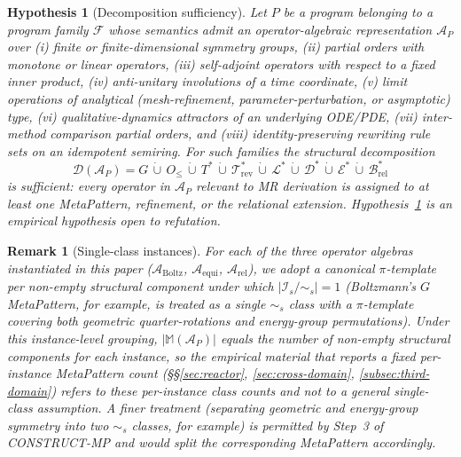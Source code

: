 \documentclass[acmsmall,screen,review]{acmart}
\newtheorem{hypothesis}{Hypothesis}
\newtheorem{remark}{Remark}
\begin{document}
\begin{hypothesis}[Decomposition sufficiency]
\label{hyp:seven-blocks}
Let $P$ be a program belonging to a program family $\mathcal{F}$ whose semantics admit an operator-algebraic representation $\mathcal{A}_P$ over (i) finite or finite-dimensional symmetry groups, (ii) partial orders with monotone or linear operators, (iii) self-adjoint operators with respect to a fixed inner product, (iv) anti-unitary involutions of a time coordinate, (v) limit operations of analytical (mesh-refinement, parameter-perturbation, or asymptotic) type, (vi) qualitative-dynamics attractors of an underlying ODE/PDE, (vii) inter-method comparison partial orders, and (viii) identity-preserving rewriting rule sets on an idempotent semiring. For such families the structural decomposition
$$\mathcal{D}(\mathcal{A}_P) = G \,\dot\cup\, O_{\le} \,\dot\cup\, T^{*} \,\dot\cup\, \mathcal{T}^{*}_{\mathrm{rev}} \,\dot\cup\, \mathcal{L}^{*} \,\dot\cup\, \mathcal{D}^{*} \,\dot\cup\, \mathcal{E}^{*} \,\dot\cup\, \mathcal{B}^{*}_{\mathrm{rel}}$$
is sufficient: every operator in $\mathcal{A}_P$ relevant to MR derivation is assigned to at least one MetaPattern, refinement, or the relational extension. Hypothesis~\ref{hyp:seven-blocks} is an empirical hypothesis open to refutation.
\end{hypothesis}

\begin{remark}[Single-class instances]
\label{rem:single-class-instances}
For each of the three operator algebras instantiated in this paper ($\mathcal{A}_{\mathrm{Boltz}}$, $\mathcal{A}_{\mathrm{equi}}$, $\mathcal{A}_{\mathrm{rel}}$), we adopt a canonical $\pi$-template per non-empty structural component under which $|\mathcal{I}_s/\sim_s|=1$ (Boltzmann's $G$ MetaPattern, for example, is treated as a single $\sim_s$ class with a $\pi$-template covering both geometric quarter-rotations and energy-group permutations). Under this instance-level grouping, $|\mathbb{M}(\mathcal{A}_P)|$ equals the number of non-empty structural components for each instance, so the empirical material that reports a fixed per-instance MetaPattern count (\S\S\ref{sec:reactor}, \ref{sec:cross-domain}, \ref{subsec:third-domain}) refers to these per-instance class counts and not to a general single-class assumption. A finer treatment (separating geometric and energy-group symmetry into two $\sim_s$ classes, for example) is permitted by Step~3 of CONSTRUCT-MP and would split the corresponding MetaPattern accordingly.
\end{remark}
\end{document}
